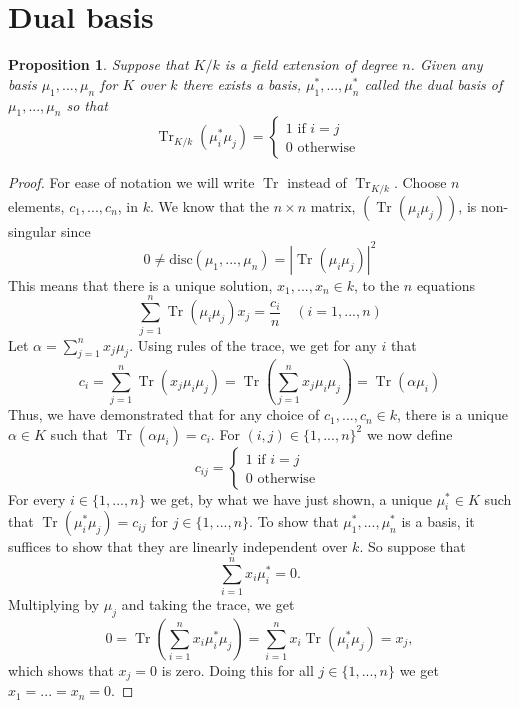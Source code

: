 \documentclass{article}
\DeclareMathOperator{\tr}{Tr}
\newtheorem{proposition}{Proposition}[section]
\numberwithin{equation}{section}
\begin{document}
\section{Dual basis}

\begin{proposition}\label{prop: Existence of dual basis}
    Suppose that $K/k$ is a field extension of degree $n$. Given any basis $\mu_1, ..., \mu_n$ for $K$ over $k$ there exists a basis, $\mu_1^*, ..., \mu_n^*$ called the dual basis of $\mu_1, ..., \mu_n$ so that
    $$\tr_{K/k}(\mu_i^* \mu_j) = \begin{cases*}
            1 \text{ if } i = j \\
            0 \text{ otherwise }
        \end{cases*}$$
\end{proposition}

\begin{proof}
    For ease of notation we will write $\tr$ instead of $\tr_{K/k}$. Choose $n$ elements, $c_1, ..., c_n$, in $k$. We know that the $n \times n$ matrix, $(\tr (\mu_i \mu_j))$, is non-singular since $$0 \neq \text{disc}(\mu_1, ..., \mu_n) = |\tr(\mu_i \mu_j)|^2$$
    This means that there is a unique solution, $x_1, ..., x_n \in k$, to the $n$ equations
    $$\sum_{j=1}^n \tr(\mu_i \mu_j) x_j = \frac{c_i}{n} \quad (i = 1, ..., n)$$
    Let $\alpha = \sum_{j=1}^n x_j \mu_j$. Using rules of the trace, we get for any $i$ that
    $$c_i = \sum_{j=1}^n \tr(x_j \mu_i \mu_j) = \tr(\sum_{j=1}^n x_j \mu_i \mu_j) = \tr(\alpha \mu_i)$$
    Thus, we have demonstrated that for any choice of $c_1, ..., c_n \in k$, there is a unique $\alpha \in K$ such that $\tr(\alpha \mu_i)= c_i$. For $(i,j) \in \{1, ..., n\}^2$ we now define
    $$c_{ij} = \begin{cases*}
            1 \text{ if } i = j \\
            0 \text{ otherwise }
        \end{cases*}$$
    For every $i \in \{1, ..., n \}$ we get, by what we have just shown, a unique $\mu_i^* \in K$ such that $\tr(\mu_i^* \mu_j) = c_{ij}$ for $j \in \{ 1, ..., n \}$. To show that $\mu_1^*, ..., \mu_n^*$ is a basis, it suffices to show that they are linearly independent over $k$. So suppose that
    $$\sum_{i=1}^n x_i \mu_i^* = 0.$$
    Multiplying by $\mu_j$ and taking the trace, we get
    $$0 = \tr(\sum_{i=1}^n x_i \mu_i^* \mu_j) = \sum_{i=1}^n x_i \tr(\mu_i^* \mu_j) = x_j,$$
    which shows that $x_j = 0$ is zero. Doing this for all $j \in \{1, ..., n \}$ we get $x_1 = ... = x_n = 0$.
\end{proof}
\end{document}
